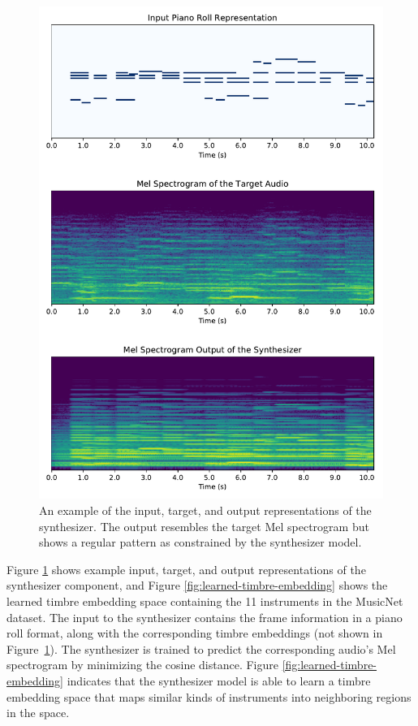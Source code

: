 \begin{figure}
\centering
\includegraphics[width=\textwidth]{synthesizer-output.pdf}
\caption{An example of the input, target, and output representations of the synthesizer. The output resembles the target Mel spectrogram but shows a regular pattern as constrained by the synthesizer model. }\label{fig:synthesizer-output}
\end{figure}

Figure \ref{fig:synthesizer-output} shows example input, target, and output representations of the synthesizer component, and Figure \ref{fig:learned-timbre-embedding} shows the learned timbre embedding space containing the 11 instruments in the MusicNet dataset.
The input to the synthesizer contains the frame information in a piano roll format, along with the corresponding timbre embeddings (not shown in Figure~\ref{fig:synthesizer-output}).
The synthesizer is trained to predict the corresponding audio's Mel spectrogram by minimizing the cosine distance.
Figure \ref{fig:learned-timbre-embedding} indicates that the synthesizer model is able to learn a timbre embedding space that maps similar kinds of instruments into neighboring regions in the space.

